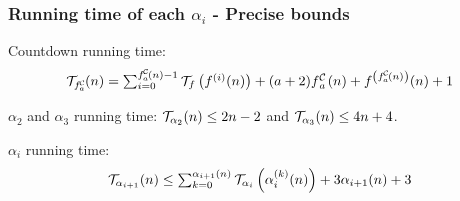 \begin{frame}
\frametitle{Running time of each $\alpha_i$ - Precise bounds}

Countdown running time:
\begin{equation*}
\textstyle \runtime_{\cdt{f}{a}}(n) =
\sum_{i=0}^{\cdt{f}{a}(n) - 1} \runtime_f\left(f^{(i)}(n)\right)
+ (a + 2)\cdt{f}{a}(n) + f^{\left(\cdt{f}{a}(n)\right)}(n) + 1
\end{equation*}

\smallskip

$\alpha_2$ and $\alpha_3$ running time: $\mathcal{T}_{\alpha_2}(n) \le 2n - 2$ and $\mathcal{T}_{\alpha_3}(n) \le 4n + 4$.

\bigskip 

$\alpha_i$ running time:
\begin{equation*}
\textstyle \mathcal{T}_{\alpha_{i+1}}(n) \le \sum_{k=0}^{\alpha_{i+1}(n)}\mathcal{T}_{\alpha_i}\left( \alpha_i^{(k)}(n)\right) + 3\alpha_{i+1}(n) + 3
\end{equation*}

\smallskip
{}

\end{frame}



